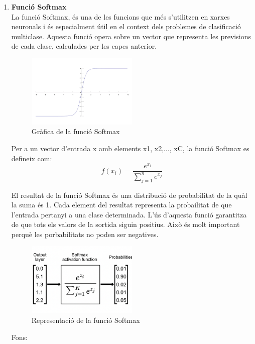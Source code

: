 \begin{enumerate}
\item \textbf{Funció Softmax}\\

La funció Softmax, és una de les funcions que més s'utilitzen en xarxes neuronals i és especialment útil en el context dels problemes de clasificació multiclase. Aquesta funció opera sobre un vector que representa les previsions de cada clase, calculades per les capes anterior.

\begin{figure}[h!]
    \centering
    \includegraphics[width=0.5\textwidth]{./figures/Softmax.png}
    \caption{Gràfica de la funció Softmax}
\end{figure}

Per a un vector d'entrada x amb elements x1, x2,..., xC, la funció Softmax es defineix com:
\[f(x_i) = \frac{e^{x_i}}{\sum_{j=1}^{n} e^{x_j}}\]

El resultat de la funció Softmax és una distribució de probabilitat de la quàl la suma és 1. Cada element del resultat representa la probailitat de que l'entrada pertanyi a una clase determinada. L'ús d'aquesta funció garantitza de que tots els valors de la sortida siguin positius. Això és molt important perquè les porbabilitats no poden ser negatives.

\begin{figure}[H]
    \centering
    \includegraphics[width=0.5\textwidth]{./figures/representacio_Softmax.png}
    \caption{Representació de la funció Softmax}
\end{figure}

Fons: ~\cite{Hidden_layer} ~\cite{Jacar}
\end{enumerate}

